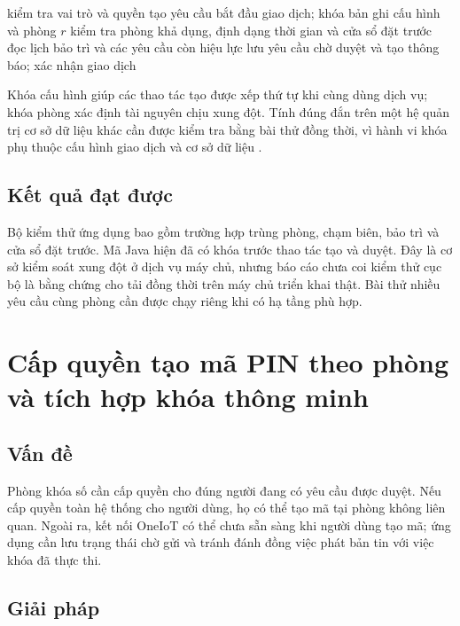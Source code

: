 \documentclass[../DoAn.tex]{subfiles}
\begin{document}
\begin{algorithm}[H]
\SetAlgoLined
\caption{Tạo yêu cầu đặt phòng trong một giao dịch}
\label{alg:taobooking}
kiểm tra vai trò và quyền tạo yêu cầu\;
bắt đầu giao dịch; khóa bản ghi cấu hình và phòng $r$\;
kiểm tra phòng khả dụng, định dạng thời gian và cửa sổ đặt trước\;
đọc lịch bảo trì và các yêu cầu còn hiệu lực\;
lưu yêu cầu chờ duyệt và tạo thông báo; xác nhận giao dịch\;
\end{algorithm}

Khóa cấu hình giúp các thao tác tạo được xếp thứ tự khi cùng dùng dịch vụ; khóa phòng xác định tài nguyên chịu xung đột. Tính đúng đắn trên một hệ quản trị cơ sở dữ liệu khác cần được kiểm tra bằng bài thử đồng thời, vì hành vi khóa phụ thuộc cấu hình giao dịch và cơ sở dữ liệu \cite{bernstein2009transaction}.

\subsection{Kết quả đạt được}
Bộ kiểm thử ứng dụng bao gồm trường hợp trùng phòng, chạm biên, bảo trì và cửa sổ đặt trước. Mã Java hiện đã có khóa trước thao tác tạo và duyệt. Đây là cơ sở kiểm soát xung đột ở dịch vụ máy chủ, nhưng báo cáo chưa coi kiểm thử cục bộ là bằng chứng cho tải đồng thời trên máy chủ triển khai thật. Bài thử nhiều yêu cầu cùng phòng cần được chạy riêng khi có hạ tầng phù hợp.

\section{Cấp quyền tạo mã PIN theo phòng và tích hợp khóa thông minh}
\label{section:5.2}

\subsection{Vấn đề}
Phòng khóa số cần cấp quyền cho đúng người đang có yêu cầu được duyệt. Nếu cấp quyền toàn hệ thống cho người dùng, họ có thể tạo mã tại phòng không liên quan. Ngoài ra, kết nối OneIoT có thể chưa sẵn sàng khi người dùng tạo mã; ứng dụng cần lưu trạng thái chờ gửi và tránh đánh đồng việc phát bản tin với việc khóa đã thực thi.

\subsection{Giải pháp}
\end{document}
